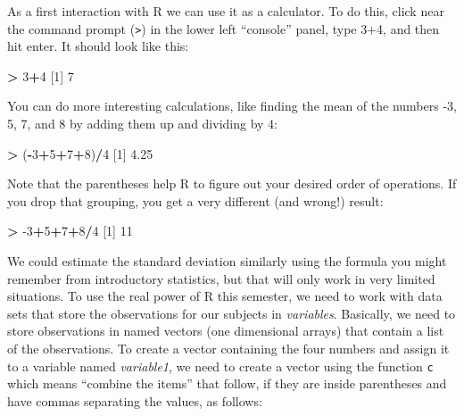 \documentclass[]{book}
\newenvironment{Shaded}{\begin{snugshade}}{\end{snugshade}}
\newcommand{\DecValTok}[1]{\textcolor[rgb]{0.00,0.00,0.81}{#1}}
\newcommand{\FloatTok}[1]{\textcolor[rgb]{0.00,0.00,0.81}{#1}}
\newcommand{\NormalTok}[1]{#1}
\newcommand{\OperatorTok}[1]{\textcolor[rgb]{0.81,0.36,0.00}{\textbf{#1}}}
\newcommand{\StringTok}[1]{\textcolor[rgb]{0.31,0.60,0.02}{#1}}
\renewcommand{\indent}{\hspace{15pt}}
\renewenvironment{Shaded}{%
\setlength{\FrameRule}{1.5pt}
\def\FrameCommand{\fboxrule=\FrameRule\fboxsep=5pt 
                  \fcolorbox{framecolor}{shadecolor}}%
\MakeFramed {\FrameRestore}}%
{\endMakeFramed}
\begin{document}
\indent As a first interaction with R we can use it as a calculator. To do this, click near the command prompt
(\texttt{\textgreater{}}) in the lower left ``console'' panel, type 3+4, and then hit enter. It
should look like this:

\begin{Shaded}
\begin{Highlighting}[]
\OperatorTok{>}\StringTok{ }\DecValTok{3}\OperatorTok{+}\DecValTok{4}
\NormalTok{[}\DecValTok{1}\NormalTok{] }\DecValTok{7}
\end{Highlighting}
\end{Shaded}

You can do more interesting calculations, like finding the mean of the
numbers -3, 5, 7, and 8 by adding them up and dividing by 4:

\begin{Shaded}
\begin{Highlighting}[]
\OperatorTok{>}\StringTok{ }\NormalTok{(}\OperatorTok{-}\DecValTok{3}\OperatorTok{+}\DecValTok{5}\OperatorTok{+}\DecValTok{7}\OperatorTok{+}\DecValTok{8}\NormalTok{)}\OperatorTok{/}\DecValTok{4}
\NormalTok{[}\DecValTok{1}\NormalTok{] }\FloatTok{4.25}
\end{Highlighting}
\end{Shaded}

Note that the parentheses help R to figure out your desired order of operations. If you drop that grouping, you get
a very different (and wrong!) result:

\begin{Shaded}
\begin{Highlighting}[]
\OperatorTok{>}\StringTok{ }\DecValTok{-3}\OperatorTok{+}\DecValTok{5}\OperatorTok{+}\DecValTok{7}\OperatorTok{+}\DecValTok{8}\OperatorTok{/}\DecValTok{4}
\NormalTok{[}\DecValTok{1}\NormalTok{] }\DecValTok{11}
\end{Highlighting}
\end{Shaded}

We could estimate the standard deviation similarly using the formula you might remember from introductory
statistics, but that will only work in very limited situations. To use the real
power of R this semester, we need to work with data sets that store the
observations for our subjects in \emph{variables}.
Basically, we need to store observations in named vectors (one dimensional
arrays) that contain a list of the observations. To create a vector containing
the four numbers and assign it to a variable named \emph{variable1}, we need to
create a vector using the function
\texttt{c} which means ``combine the items'' that follow, if they are inside
parentheses and have commas separating the values,
as follows:
\end{document}
